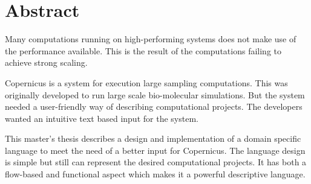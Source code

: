 \begingroup
\let\clearpage\relax
\let\cleardoublepage\relax
\let\cleardoublepage\relax

\chapter*{Abstract}

Many computations running on high-performing systems does not make use
of the performance available. This is the result of the computations
failing to achieve strong scaling.

Copernicus is a system for execution large sampling computations. This
was originally developed to run large scale bio-molecular
simulations. But the system needed a user-friendly way of describing
computational projects. The developers wanted an intuitive text based
input for the system.

This master's thesis describes a design and implementation of a domain
specific language to meet the need of a better input for
Copernicus. The language design is simple but still can represent the
desired computational projects. It has both a flow-based and
functional aspect which makes it a powerful descriptive language.

\endgroup			

\vfill
